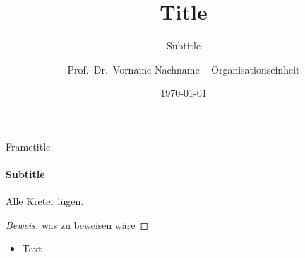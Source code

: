 \documentclass{vorlesung}
\title[\textcolor{black}{shorttitle}]{Title}
\subtitle{Subtitle}
\date[2023]{\today}
\author[Nachname et~al.]{Prof.\ Dr.\ Vorname Nachname -- Organisationseinheit}
\begin{document}
\begin{frame}
\titlepage
\end{frame}
\begin{frame}{Frametitle}
\framesubtitle{Subtitle}
\begin{theorem}
Alle Kreter lügen.
\end{theorem}
\begin{proof}[Beweis]
was zu beweisen wäre
\end{proof}
\begin{itemize}
	\item Text
\end{itemize}
\end{frame}
\end{document}
